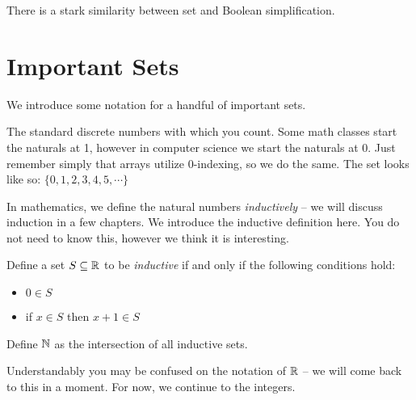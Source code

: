\documentclass[main.tex]{subfiles}
\begin{document}

\begin{rem}
	There is a stark similarity between set and Boolean simplification.
\end{rem}

\section{Important Sets}

We introduce some notation for a handful of important sets.

\begin{defn}
	The standard discrete numbers with which you count. Some math classes start the naturals at 1, however in computer science we start the naturals at 0. Just remember simply that arrays utilize 0-indexing, so we do the same. The set looks like so: \(\{0,1,2,3,4,5,\cdots\}\)
\end{defn}

In mathematics, we define the natural numbers \textit{inductively} -- we will discuss induction in a few chapters. We introduce the inductive definition here. You do not need to know this, however we think it is interesting.

\begin{prop}
	\label{ind-defn-N}
	Define a set \(S \subseteq \mathbb{R}\) to be \textit{inductive} if and only if the following conditions hold:
	\begin{itemize}
		\item \(0 \in S\)
		\item if \(x \in S\) then \(x + 1 \in S\)
	\end{itemize}
	
	\noindent Define \(\mathbb{N}\) as the intersection of all inductive sets.
\end{prop}

Understandably you may be confused on the notation of \(\mathbb{R}\) -- we will come back to this in a moment. For now, we continue to the integers.
\end{document}
